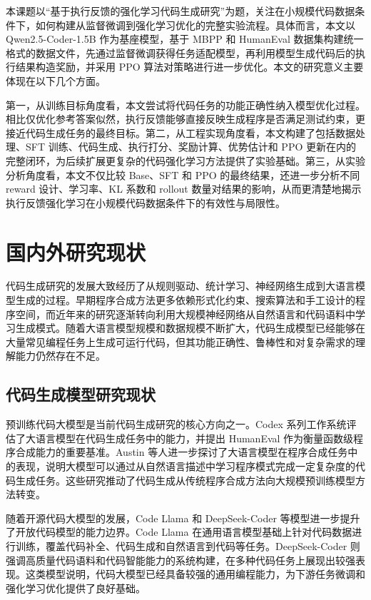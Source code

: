 本课题以“基于执行反馈的强化学习代码生成研究”为题，关注在小规模代码数据条件下，如何构建从监督微调到强化学习优化的完整实验流程。具体而言，本文以 Qwen2.5-Coder-1.5B 作为基座模型，基于 MBPP 和 HumanEval 数据集构建统一格式的数据文件，先通过监督微调获得任务适配模型，再利用模型生成代码后的执行结果构造奖励，并采用 PPO 算法对策略进行进一步优化。本文的研究意义主要体现在以下几个方面。

第一，从训练目标角度看，本文尝试将代码任务的功能正确性纳入模型优化过程。相比仅优化参考答案似然，执行反馈能够直接反映生成程序是否满足测试约束，更接近代码生成任务的最终目标。第二，从工程实现角度看，本文构建了包括数据处理、SFT 训练、代码生成、执行打分、奖励计算、优势估计和 PPO 更新在内的完整闭环，为后续扩展更复杂的代码强化学习方法提供了实验基础。第三，从实验分析角度看，本文不仅比较 Base、SFT 和 PPO 的最终结果，还进一步分析不同 reward 设计、学习率、KL 系数和 rollout 数量对结果的影响，从而更清楚地揭示执行反馈强化学习在小规模代码数据条件下的有效性与局限性。

\section{国内外研究现状}

代码生成研究的发展大致经历了从规则驱动、统计学习、神经网络生成到大语言模型生成的过程。早期程序合成方法更多依赖形式化约束、搜索算法和手工设计的程序空间，而近年来的研究逐渐转向利用大规模神经网络从自然语言和代码语料中学习生成模式。随着大语言模型规模和数据规模不断扩大，代码生成模型已经能够在大量常见编程任务上生成可运行代码，但其功能正确性、鲁棒性和对复杂需求的理解能力仍然存在不足。

\subsection{代码生成模型研究现状}

预训练代码大模型是当前代码生成研究的核心方向之一。Codex 系列工作系统评估了大语言模型在代码生成任务中的能力，并提出 HumanEval 作为衡量函数级程序合成能力的重要基准\cite{Chen2021Codex}。Austin 等人进一步探讨了大语言模型在程序合成任务中的表现，说明大模型可以通过从自然语言描述中学习程序模式完成一定复杂度的代码生成任务\cite{Austin2021ProgramSynthesis}。这些研究推动了代码生成从传统程序合成方法向大规模预训练模型方法转变。

随着开源代码大模型的发展，Code Llama 和 DeepSeek-Coder 等模型进一步提升了开放代码模型的能力边界。Code Llama 在通用语言模型基础上针对代码数据进行训练，覆盖代码补全、代码生成和自然语言到代码等任务\cite{Roziere2023CodeLlama}。DeepSeek-Coder 则强调高质量代码语料和代码智能能力的系统构建，在多种代码任务上展现出较强表现\cite{Guo2024DeepSeekCoder}。这类模型说明，代码大模型已经具备较强的通用编程能力，为下游任务微调和强化学习优化提供了良好基础。

